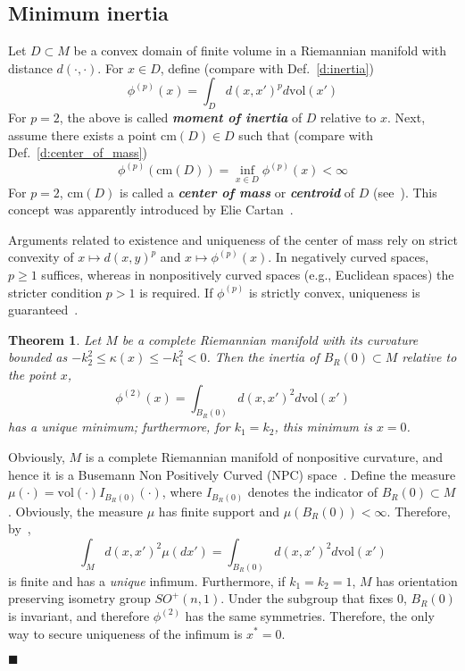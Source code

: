 \documentclass{article}
\newcommand{\vol}{\mathrm{vol}}
\newtheorem{theorem}{Theorem}
\newenvironment{proof}
{\noindent {\bf Proof.}}
{$\blacksquare$}
\begin{document}
\noindent 

\noindent 
\subsection{Minimum inertia  }

Let $D \subset M$ be a convex domain of finite volume 
in a Riemannian manifold 
with distance $d(\cdot,\cdot)$.  
For $x \in D$, define (compare with Def.~\ref{d:inertia})
$$ \phi^{(p)}(x)=\int_D d(x,x')^p d\vol(x')$$
For $p=2$, the above is called \textbf{\textit{moment of inertia}} of $D$ relative to $x$. 
Next, assume there exists a point $\mathrm{cm}(D)\in D$ such that (compare with Def.~\ref{d:center_of_mass})
$$ \phi^{(p)}(\mathrm{cm}(D))=\inf_{x\in D} \phi^{(p)}(x) < \infty$$
For $p=2$, $\mathrm{cm}(D)$ is called a \textit{\textbf{center of mass}} or \textit{\textbf{centroid}} 
of $D$ (see~\cite[Def. 3.2.1]{Jost1997}). 
This concept was apparently introduced by Elie Cartan~\cite[p. 47]{Berger2000}. 

Arguments related to existence and uniqueness of the center of mass rely on strict convexity 
of $x \mapsto d(x,y)^p$ and $x \mapsto \phi^{(p)} (x)$. 
In negatively curved spaces, $p \geq 1$ suffices, 
whereas in nonpositively curved spaces (e.g., Euclidean spaces) the stricter condition $p>1$ is required. 
If $\phi^{(p)}$ is strictly convex, uniqueness is guaranteed~\cite[Lemma 3.1.1]{Jost1997}. 


\noindent 
\begin{theorem}
\label{t:min_inertia}
Let $M$ be a complete Riemannian manifold with its curvature bounded as 
$-k_2^2 \leq \kappa(x) \leq -k_1^2< 0$. 
Then the inertia of $B_R(0) \subset M$ relative to the point $x$,
\[\phi^{(2)} (x)=\int \nolimits _{B_{R}(0) }d(x,x')^2d\vol(x') \] 
has a unique minimum; furthermore, for $k_1=k_2$, this minimum is $x=0$. 
\end{theorem}

\begin{proof} 
Obviously, $M$ is a complete Riemannian manifold of nonpositive curvature, 
and hence it is a Busemann Non Positively Curved (NPC) space~\cite[page 45]{Jost1997}. 
Define the measure $\mu(\cdot)=\vol(\cdot) I_{B_R(0)}(\cdot)$, 
where $I_{B_R(0)}$ denotes the indicator of $B_R(0) \subset M$. 
Obviously, the measure $\mu$ has finite support and $\mu(B_R(0))<\infty$. 
Therefore, by~\cite[Th. 3.2.1]{Jost1997},
$$ \int_M d(x,x')^2 \mu(dx')=\int_{B_R(0)} d(x,x')^2 d\vol(x') $$
is finite and has a {\it unique} infimum. Furthermore, if $k_1=k_2=1$, 
$M$ has orientation preserving isometry group $SO^+(n,1)$. 
Under the subgroup that fixes $0$, $B_R(0)$ is invariant, 
and therefore $\phi^{(2)}$ has the same symmetries. 
Therefore, the only way to secure uniqueness of the infimum is $x^*=0$. 


\end{proof}
\end{document}

